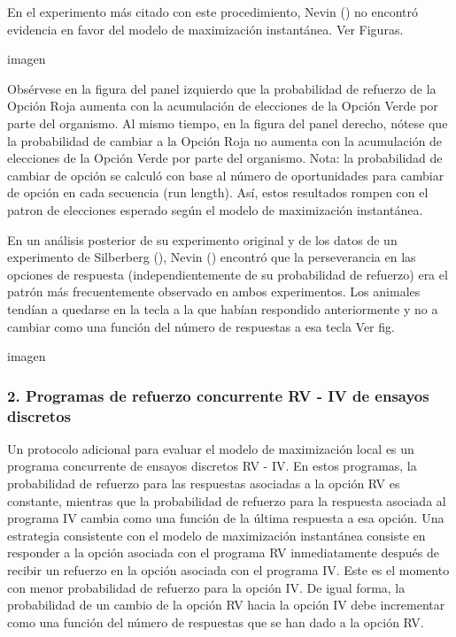 \documentclass[
  a4paper,
  DIV=11,
  numbers=noendperiod]{scrreprt}
\begin{document}
En el experimento más citado con este procedimiento, Nevin () no
encontró evidencia en favor del modelo de maximización instantánea. Ver
Figuras.

imagen

Obsérvese en la figura del panel izquierdo que la probabilidad de
refuerzo de la Opción Roja aumenta con la acumulación de elecciones de
la Opción Verde por parte del organismo. Al mismo tiempo, en la figura
del panel derecho, nótese que la probabilidad de cambiar a la Opción
Roja no aumenta con la acumulación de elecciones de la Opción Verde por
parte del organismo. Nota: la probabilidad de cambiar de opción se
calculó con base al número de oportunidades para cambiar de opción en
cada secuencia (run length). Así, estos resultados rompen con el patron
de elecciones esperado según el modelo de maximización instantánea.

En un análisis posterior de su experimento original y de los datos de un
experimento de Silberberg (), Nevin () encontró que la perseverancia en
las opciones de respuesta (independientemente de su probabilidad de
refuerzo) era el patrón más frecuentemente observado en ambos
experimentos. Los animales tendían a quedarse en la tecla a la que
habían respondido anteriormente y no a cambiar como una función del
número de respuestas a esa tecla Ver fig.

imagen

\subsubsection{2. Programas de refuerzo concurrente RV - IV de ensayos
discretos}\label{programas-de-refuerzo-concurrente-rv---iv-de-ensayos-discretos}

Un protocolo adicional para evaluar el modelo de maximización local es
un programa concurrente de ensayos discretos RV - IV. En estos
programas, la probabilidad de refuerzo para las respuestas asociadas a
la opción RV es constante, mientras que la probabilidad de refuerzo para
la respuesta asociada al programa IV cambia como una función de la
última respuesta a esa opción. Una estrategia consistente con el modelo
de maximización instantánea consiste en responder a la opción asociada
con el programa RV inmediatamente después de recibir un refuerzo en la
opción asociada con el programa IV. Este es el momento con menor
probabilidad de refuerzo para la opción IV. De igual forma, la
probabilidad de un cambio de la opción RV hacia la opción IV debe
incrementar como una función del número de respuestas que se han dado a
la opción RV.
\end{document}
